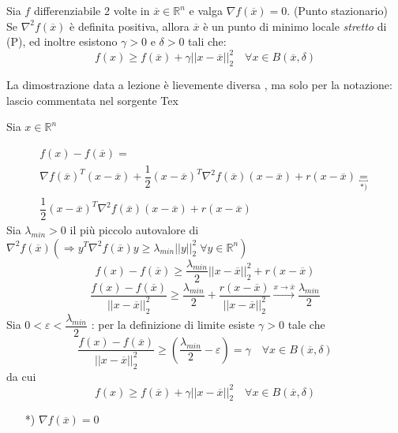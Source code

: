 \begin{theo}
\label{theo:punto-stazionario-minimo-locale}
Sia $f$ differenziabile 2 volte in $\overline{x} \in \mathbb{R}^{n}$ e valga
$\nabla f(\overline{x})=0$. (Punto stazionario) \\
 Se $\nabla^{2}f(\overline{x})$ è definita positiva,
allora $\overline{x}$ è un punto di minimo locale \emph{stretto} di (P), ed inoltre
esistono $\gamma > 0$ e $\delta >0$ tali che:
$$ f(x) \geq f(\overline{x}) + \gamma || x- \overline{x} ||^{2}_{2} \quad \forall x \in B(\overline{x}, \delta)$$
\end{theo}
\begin{thproof}
\begin{notes}
La dimostrazione data a lezione \`e lievemente diversa
, ma solo per la notazione: lascio commentata nel sorgente
Tex
\end{notes}
Sia $x \in \mathbb{R}^{n}$

$$
\begin{array}{l}
 f(x) - f(\overline{x}) = \\
 \nabla
f(\overline{x})^{T}(x - \overline{x}) +
\dfrac{1}{2}(x-\overline{x})^{T}
\nabla^{2}f(\overline{x})(x - \overline{x})
+ r(x - \overline{x}) \underbracket{ = }_{*)}
 \\
\dfrac{1}{2}(x-\overline{x})^{T}
\nabla^{2}f(\overline{x})(x - \overline{x})
+ r(x - \overline{x})
\end{array}
$$
Sia $\lambda_{min}>0$ il pi\`u piccolo autovalore di
$\nabla^{2}f(\overline{x}) 
(\Rightarrow y^{T} \nabla^{2}f(\overline{x})y \geq
\lambda_{min} ||y||_{2}^{2} \; \forall y \in \mathbb{R}^{n}
)$ 
$$f(x) - f(\overline{x}) \geq \dfrac{\lambda_{min}}{2}
|| x - \overline{x} ||_{2}^{2} + r(x - \overline{x}) 
 $$
$$
\dfrac{f(x)-f(\overline{x})}{||x - \overline{x}||_{2}^{2}}
\geq \dfrac{\lambda_{min}}{2}
 + \dfrac{r(x - \overline{x})}{|| x - \overline{x} ||_{2}^{2}}
\xrightarrow{x \to \overline{x}} \dfrac{\lambda_{min}}{2}
 $$
Sia $0 < \varepsilon < \dfrac{\lambda_{min}}{2}$ :
per la definizione di limite esiste $\gamma > 0$ tale che
$$
\dfrac{f(x) - f(\overline{x})}{||x - \overline{x}||_{2}^{2}}
\geq (\dfrac{\lambda_{min}}{2} - \varepsilon) = \gamma
\quad \forall x \in B(\overline{x},\delta)
$$
da cui
$$ f(x) \geq f(\overline{x}) + \gamma || x - \overline{x}||_{2}^{2} \quad \forall x \in B(\overline{x},\delta)$$
\begin{itemize}
\item[*)] $\nabla f(\overline{x})=0$
\end{itemize}


\end{thproof}
